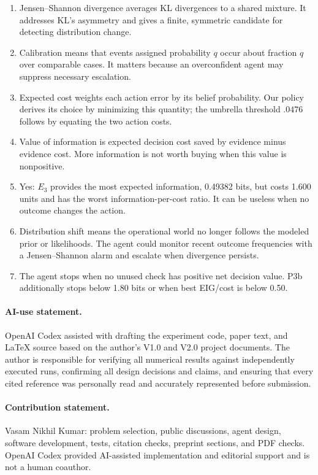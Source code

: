 \documentclass{article}
\begin{document}
\begin{enumerate}
\item Jensen--Shannon divergence averages KL divergences to a shared mixture. It addresses KL's asymmetry and gives a finite, symmetric candidate for detecting distribution change.
\item Calibration means that events assigned probability $q$ occur about fraction $q$ over comparable cases. It matters because an overconfident agent may suppress necessary escalation.
\item Expected cost weights each action error by its belief probability. Our policy derives its choice by minimizing this quantity; the umbrella threshold $.0476$ follows by equating the two action costs.
\item Value of information is expected decision cost saved by evidence minus evidence cost. More information is not worth buying when this value is nonpositive.
\item Yes: $E_3$ provides the most expected information, 0.49382 bits, but costs 1.600 units and has the worst information-per-cost ratio. It can be useless when no outcome changes the action.
\item Distribution shift means the operational world no longer follows the modeled prior or likelihoods. The agent could monitor recent outcome frequencies with a Jensen--Shannon alarm and escalate when divergence persists.
\item The agent stops when no unused check has positive net decision value. P3b additionally stops below 1.80 bits or when best EIG/cost is below 0.50.
\end{enumerate}

\paragraph{AI-use statement.} OpenAI Codex assisted with drafting the experiment code, paper text, and LaTeX source based on the author's V1.0 and V2.0 project documents. The author is responsible for verifying all numerical results against independently executed runs, confirming all design decisions and claims, and ensuring that every cited reference was personally read and accurately represented before submission.

\paragraph{Contribution statement.} Vasam Nikhil Kumar: problem selection, public discussions, agent design, software development, tests, citation checks, preprint sections, and PDF checks. OpenAI Codex provided AI-assisted implementation and editorial support and is not a human coauthor.



\end{document}

